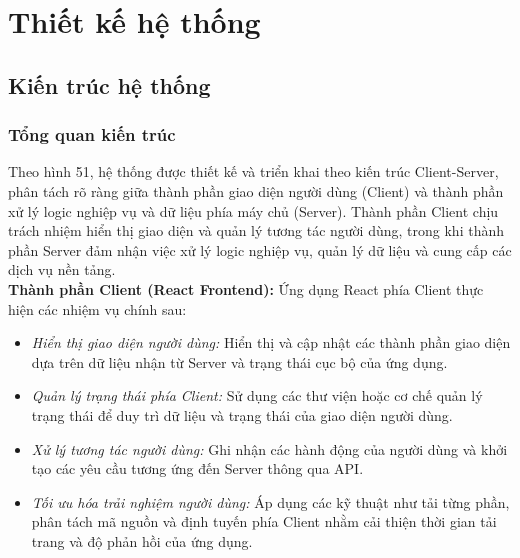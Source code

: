 \section{Thiết kế hệ thống}
\subsection{Kiến trúc hệ thống}
\begin{figure}[H]
    \thispagestyle{empty}
    \centering
\end{figure}

\subsubsection{Tổng quan kiến trúc}
Theo hình 51, hệ thống được thiết kế và triển khai theo kiến trúc Client-Server, phân tách rõ ràng giữa thành phần giao diện người dùng (Client) và thành phần xử lý logic nghiệp vụ và dữ liệu phía máy chủ (Server). Thành phần Client chịu trách nhiệm hiển thị giao diện và quản lý tương tác người dùng, trong khi thành phần Server đảm nhận việc xử lý logic nghiệp vụ, quản lý dữ liệu và cung cấp các dịch vụ nền tảng. \\

\textbf{Thành phần Client (React Frontend):} Ứng dụng React phía Client thực hiện các nhiệm vụ chính sau:
\begin{itemize}
    \item \textit{Hiển thị giao diện người dùng:} Hiển thị và cập nhật các thành phần giao diện dựa trên dữ liệu nhận từ Server và trạng thái cục bộ của ứng dụng.
    \item \textit{Quản lý trạng thái phía Client:} Sử dụng các thư viện hoặc cơ chế quản lý trạng thái để duy trì dữ liệu và trạng thái của giao diện người dùng.
    \item \textit{Xử lý tương tác người dùng:} Ghi nhận các hành động của người dùng và khởi tạo các yêu cầu tương ứng đến Server thông qua API.
    \item \textit{Tối ưu hóa trải nghiệm người dùng:} Áp dụng các kỹ thuật như tải từng phần, phân tách mã nguồn và định tuyến phía Client nhằm cải thiện thời gian tải trang và độ phản hồi của ứng dụng.
\end{itemize}

